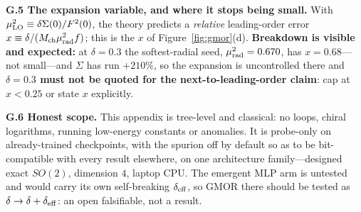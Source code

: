 \documentclass{article}
\begin{document}
\textbf{G.5 The expansion variable, and where it stops being small.} With $\mu^2_{\rm LO}\equiv\delta\Sigma(0)/F^2(0)$, the theory predicts a \emph{relative} leading-order error $x\equiv\delta/(M_{\rm ch}\mu_{\rm rad}^2f)$; this is the $x$ of Figure~\ref{fig:gmor}(d). \textbf{Breakdown is visible and expected:} at $\delta=0.3$ the softest-radial seed, $\mu_{\rm rad}^2=0.670$, has $x=0.68$---not small---and $\Sigma$ has run $+210\%$, so the expansion is uncontrolled there and \textbf{$\delta=0.3$ must not be quoted for the next-to-leading-order claim}: cap at $x<0.25$ or state $x$ explicitly.

\textbf{G.6 Honest scope.} This appendix is tree-level and classical: no loops, chiral logarithms, running low-energy constants or anomalies. It is probe-only on already-trained checkpoints, with the spurion off by default so as to be bit-compatible with every result elsewhere, on one architecture family---designed exact $SO(2)$, dimension $4$, laptop CPU. The emergent MLP arm is untested and would carry its own self-breaking $\delta_{\rm eff}$, so GMOR there should be tested as $\delta\to\delta+\delta_{\rm eff}$: an open falsifiable, not a result.
\end{document}
